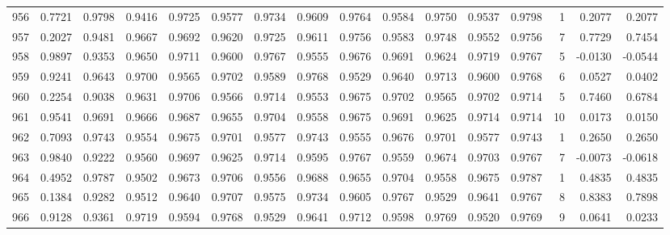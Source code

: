 \begin{tabular}{lrrrrrrrrrrrrrrr}
956 &      0.7721 &  0.9798 &  0.9416 &  0.9725 &  0.9577 &  0.9734 &  0.9609 &  0.9764 &  0.9584 &  0.9750 &   0.9537 &     0.9798 &      1 &                    0.2077 &                     0.2077 \\
957 &      0.2027 &  0.9481 &  0.9667 &  0.9692 &  0.9620 &  0.9725 &  0.9611 &  0.9756 &  0.9583 &  0.9748 &   0.9552 &     0.9756 &      7 &                    0.7729 &                     0.7454 \\
958 &      0.9897 &  0.9353 &  0.9650 &  0.9711 &  0.9600 &  0.9767 &  0.9555 &  0.9676 &  0.9691 &  0.9624 &   0.9719 &     0.9767 &      5 &                   -0.0130 &                    -0.0544 \\
959 &      0.9241 &  0.9643 &  0.9700 &  0.9565 &  0.9702 &  0.9589 &  0.9768 &  0.9529 &  0.9640 &  0.9713 &   0.9600 &     0.9768 &      6 &                    0.0527 &                     0.0402 \\
960 &      0.2254 &  0.9038 &  0.9631 &  0.9706 &  0.9566 &  0.9714 &  0.9553 &  0.9675 &  0.9702 &  0.9565 &   0.9702 &     0.9714 &      5 &                    0.7460 &                     0.6784 \\
961 &      0.9541 &  0.9691 &  0.9666 &  0.9687 &  0.9655 &  0.9704 &  0.9558 &  0.9675 &  0.9691 &  0.9625 &   0.9714 &     0.9714 &     10 &                    0.0173 &                     0.0150 \\
962 &      0.7093 &  0.9743 &  0.9554 &  0.9675 &  0.9701 &  0.9577 &  0.9743 &  0.9555 &  0.9676 &  0.9701 &   0.9577 &     0.9743 &      1 &                    0.2650 &                     0.2650 \\
963 &      0.9840 &  0.9222 &  0.9560 &  0.9697 &  0.9625 &  0.9714 &  0.9595 &  0.9767 &  0.9559 &  0.9674 &   0.9703 &     0.9767 &      7 &                   -0.0073 &                    -0.0618 \\
964 &      0.4952 &  0.9787 &  0.9502 &  0.9673 &  0.9706 &  0.9556 &  0.9688 &  0.9655 &  0.9704 &  0.9558 &   0.9675 &     0.9787 &      1 &                    0.4835 &                     0.4835 \\
965 &      0.1384 &  0.9282 &  0.9512 &  0.9640 &  0.9707 &  0.9575 &  0.9734 &  0.9605 &  0.9767 &  0.9529 &   0.9641 &     0.9767 &      8 &                    0.8383 &                     0.7898 \\
966 &      0.9128 &  0.9361 &  0.9719 &  0.9594 &  0.9768 &  0.9529 &  0.9641 &  0.9712 &  0.9598 &  0.9769 &   0.9520 &     0.9769 &      9 &                    0.0641 &                     0.0233 \\

\end{tabular}
